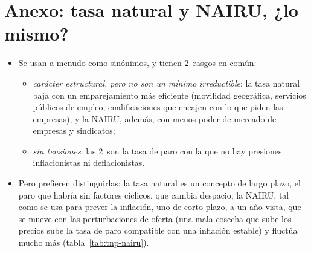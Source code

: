\documentclass[11pt]{article}
\begin{document}
\section{Anexo: tasa natural y NAIRU, ¿lo mismo?}\label{anexo:tnp-nairu}

\begin{itemize}
\item Se usan a menudo como sinónimos\nocite{BallMankiw2002NAIRU}, y tienen 2~rasgos en común:
  \begin{itemize}
  \item \emph{carácter estructural, pero no son un mínimo irreductible}: la tasa natural baja con un emparejamiento más eficiente (movilidad geográfica, servicios públicos de empleo, cualificaciones que encajen con lo que piden las empresas), y la NAIRU, además, con menos poder de mercado de empresas y sindicatos;
  \item \emph{sin tensiones}: las 2~son la tasa de paro con la que no hay presiones inflacionistas ni deflacionistas.
  \end{itemize}
\item Pero \textcite{EstrellaMishkin1999NAIRU} prefieren distinguirlas: la tasa natural es un concepto de largo plazo, el paro que habría sin factores cíclicos, que cambia despacio; la NAIRU, tal como se usa para prever la inflación, uno de corto plazo, a un año vista, que se mueve con las perturbaciones de oferta (una mala cosecha que sube los precios sube la tasa de paro compatible con una inflación estable) y fluctúa mucho más (tabla~\ref{tab:tnp-nairu}).
\end{itemize}
\end{document}

